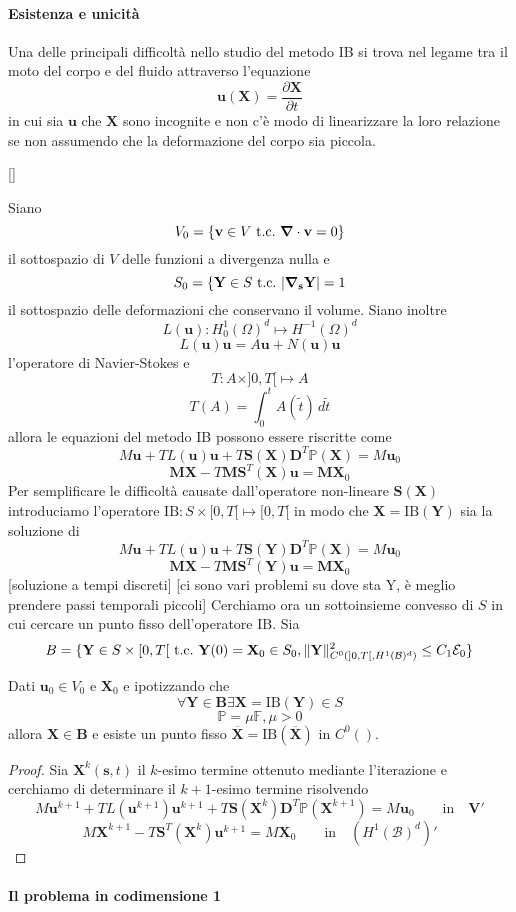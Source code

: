 \paragraph{Esistenza e unicità}
Una delle principali difficoltà nello studio del metodo IB si trova nel legame tra il moto del corpo e del fluido attraverso l'equazione 
$$\mathbf{u}(\mathbf{X})=\frac{\partial\mathbf{X}}{\partial t}$$
in cui sia $\mathbf{u}$ che $\mathbf{X}$ sono incognite e non c'è modo di linearizzare la loro relazione se non assumendo che la deformazione del corpo sia piccola.

[]

Siano $$V_0=\{\mathbf{v}\in V\ \text{t.c.}\ \boldsymbol{\nabla}\cdot\mathbf{v}=0 \}$$ il sottospazio di $V$ delle funzioni a divergenza nulla e $$S_0=\{\mathbf{Y}\in S\ \text{t.c.}\ \vert\boldsymbol{\nabla}_{\mathbf{s}}\mathbf{Y}\vert=1$$ il sottospazio delle deformazioni che conservano il volume. Siano inoltre
$$L(\mathbf{u}):H^1_0(\Omega)^d\mapsto H^{-1}(\Omega)^d$$
$$L(\mathbf{u})\mathbf{u}=A\mathbf{u}+N(\mathbf{u})\mathbf{u}$$
l'operatore di Navier-Stokes e 
$$T:A\times]0,T[\mapsto A$$
$$T(A)=\int^t_0A(\tilde{t})\, d\tilde{t}$$
allora le equazioni del metodo IB possono essere riscritte come
$$M\mathbf{u}+TL(\mathbf{u})\mathbf{u}+T\mathbf{S}(\mathbf{X})\mathbf{D}^T\mathbb{P}(\mathbf{X})=M\mathbf{u}_0$$
$$\mathbf{M}\mathbf{X}-T\mathbf{M}\mathbf{S}^T(\mathbf{X})\mathbf{u}=\mathbf{M}\mathbf{X}_0$$
Per semplificare le difficoltà causate dall'operatore non-lineare  $\mathbf{S}(\mathbf{X})$ introduciamo l'operatore $\text{IB}:S\times[0,T[\mapsto[0,T[$ in modo che $\mathbf{X}=\text{IB}(\mathbf{Y})$ sia la soluzione di
$$M\mathbf{u}+TL(\mathbf{u})\mathbf{u}+T\mathbf{S}(\mathbf{Y})\mathbf{D}^T\mathbb{P}(\mathbf{X})=M\mathbf{u}_0$$
$$\mathbf{M}\mathbf{X}-T\mathbf{M}\mathbf{S}^T(\mathbf{Y})\mathbf{u}=\mathbf{M}\mathbf{X}_0$$
 [soluzione a tempi discreti]
 [ci sono vari problemi su dove sta Y, è meglio prendere passi temporali piccoli]
Cerchiamo ora un sottoinsieme convesso di $S$ in cui cercare un punto fisso dell'operatore $\text{IB}$. Sia 
$$B=\{ \mathbf{Y}\in S\times[0,T[\ \text{t.c.}\ \mathbf{Y}(0)=\mathbf{X}_0\in S_0,\Vert\mathbf{Y}\Vert^2_{C^0(]0,T[,H^1(\mathcal{B})^d)}\leq C_1\mathcal{E}_0\}$$
\begin{theorem}
Dati $\mathbf{u}_0\in V_0$ e $\mathbf{X}_0$ e ipotizzando che
$$\forall\mathbf{Y}\in\mathbf{B}\exists\mathbf{X}=\text{IB}(\mathbf{Y})\in S$$
$$\mathbb{P}=\mu\mathbb{F}, \mu>0$$
allora $\mathbf{X}\in\mathbf{B}$ e esiste un punto fisso $\overline{\mathbf{X}}=\text{IB}(\overline{\mathbf{X}})$ in $C^0()$.
\end{theorem}
\begin{proof}
Sia $\mathbf{X}^{k}(\mathbf{s},t)$ il $k$-esimo termine ottenuto mediante l'iterazione e cerchiamo di determinare il $k+1$-esimo termine risolvendo
$$M\mathbf{u}^{k+1}+TL(\mathbf{u}^{k+1})\mathbf{u}^{k+1}+T\mathbf{S}(\mathbf{X}^{k})\mathbf{D}^{T}\mathbb{P}(\mathbf{X}^{k+1})=M\mathbf{u}_{0}\qquad\text{in}\quad\mathbf{V }'$$
$$M\mathbf{X}^{k+1}-T\mathbf{S}^{T}(\mathbf{X}^{k})\mathbf{u}^{k+1} = M\mathbf{X}_0\qquad\text{in}\quad (H^{1}(\mathcal{B})^{d})'$$
\end{proof}
\paragraph{Il problema in codimensione 1}

